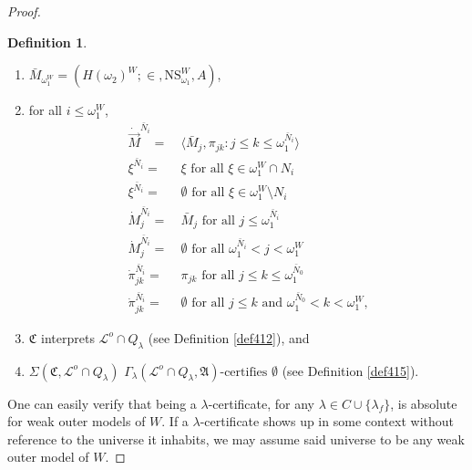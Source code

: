 \documentclass[12pt, twoside]{memoir}
\numberwithin{equation}{section}
\theoremstyle{definition}
\newtheorem{defi}[thm]{Definition}
\theoremstyle{remark}
\theoremstyle{definition}
\theoremstyle{definition}
\theoremstyle{definition}
\theoremstyle{remark}
\begin{document}
\begin{proof}
\begin{defi}
\begin{enumerate}[label=(C\arabic*)$_{\lambda}$, leftmargin=40pt]
    \item\label{cd7} $\bar{M}_{\omega_1^W} = (H(\omega_2)^W; \in, \mathrm{NS}_{\omega_1}^W, A)$,
    \item\label{2ndlast} for all $i \leq \omega_1^W$, 
    \begin{align*}
         \dot{\Vec{M}}^{\bar{N}_i} = \ & \langle \bar{M}_j, \pi_{jk} : j \leq k \leq \omega_1^{\bar{N}_i} \rangle \\
         \xi^{\bar{N}_i} = \ & \xi \text{ for all } \xi \in \omega_1^W \cap N_i \\
         \xi^{\bar{N}_i} = \ & \emptyset \text{ for all } \xi \in \omega_1^W \setminus N_i \\
         \dot{M}_j^{\bar{N}_i} = \ & \bar{M}_j \text{ for all } j \leq \omega_1^{\bar{N}_i} \\
         \dot{M}_j^{\bar{N}_i} = \ & \emptyset \text{ for all } \omega_1^{\bar{N}_i} < j < \omega_1^W \\
         \dot{\pi}_{jk}^{\bar{N}_i} = \ & \pi_{jk} \text{ for all } j \leq k \leq \omega_1^{\bar{N}_0} \\
         \dot{\pi}_{jk}^{\bar{N}_i} = \ & \emptyset \text{ for all } j \leq k \text{ and } \omega_1^{\bar{N}_0} < k < \omega_1^W \text{,}
    \end{align*}
    \item\label{cdlast} $\mathfrak{C}$ interprets $\mathcal{L}^o \cap Q_{\lambda}$ (see Definition \ref{def412}), and
    \item\label{cdrlast} $\Sigma(\mathfrak{C}, \mathcal{L}^o \cap Q_{\lambda})$ $\Gamma_{\lambda} (\mathcal{L}^o \cap Q_{\lambda}, \mathfrak{A}) \text{-certifies } \emptyset$ (see Definition \ref{def415}).
\end{enumerate}
\end{defi}

One can easily verify that being a $\lambda$-certificate, for any $\lambda \in C \cup \{\lambda_f\}$, is absolute for weak outer models of $W$. If a $\lambda$-certificate shows up in some context without reference to the universe it inhabits, we may assume said universe to be any weak outer model of $W$.


\end{proof}
\end{document}
